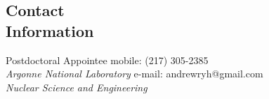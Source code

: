 \documentclass[margin,line]{resume}
\begin{document}
\begin{resume}

    \section{\mysidestyle Contact\\Information}

    Postdoctoral Appointee \hfill mobile: (217) 305-2385 
    \vspace{0mm}\\\vspace{0mm}
    \hspace{-1.35mm}\textsl{Argonne National Laboratory}
        \hfill e-mail: andrewryh@gmail.com            
        \vspace{0mm}\\\vspace{0mm}%
    \textsl{Nuclear Science and Engineering}
       

\end{resume}
\end{document}
